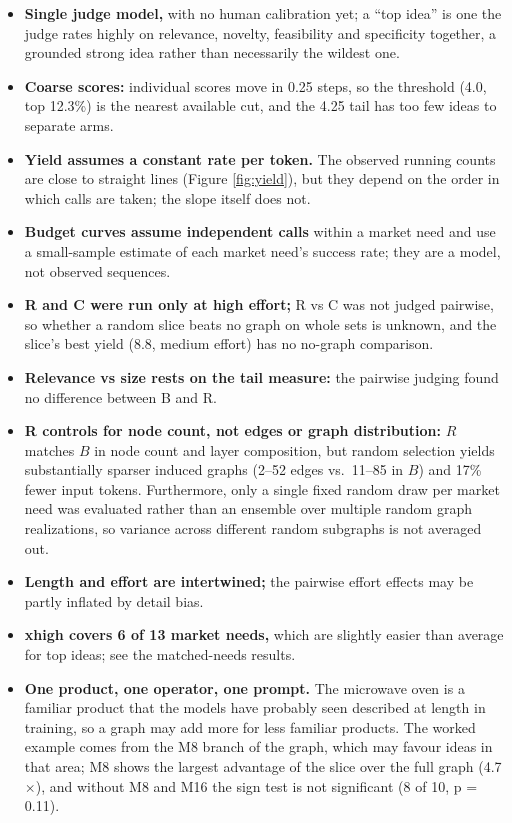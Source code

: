 \begin{itemize}
\tightlist
\item
  \textbf{Single judge model,} with no human calibration yet; a ``top idea'' is one the judge rates highly on relevance, novelty, feasibility and specificity together, a grounded strong idea rather than necessarily the wildest one.
\item
  \textbf{Coarse scores:} individual scores move in 0.25 steps, so the threshold (4.0, top 12.3\%) is the nearest available cut, and the 4.25 tail has too few ideas to separate arms.
\item
  \textbf{Yield assumes a constant rate per token.} The observed running counts are close to straight lines (Figure \ref{fig:yield}), but they depend on the order in which calls are taken; the slope itself does not.
\item
  \textbf{Budget curves assume independent calls} within a market need and use a small-sample estimate of each market need's success rate; they are a model, not observed sequences.
\item
  \textbf{R and C were run only at high effort;} R vs C was not judged pairwise, so whether a random slice beats no graph on whole sets is unknown, and the slice's best yield (8.8, medium effort) has no no-graph comparison.
\item
  \textbf{Relevance vs size rests on the tail measure:} the pairwise judging found no difference between B and R.
\item
  \textbf{R controls for node count, not edges or graph distribution:} $R$ matches $B$ in node count and layer composition, but random selection yields substantially sparser induced graphs (2--52 edges vs.\ 11--85 in $B$) and 17\% fewer input tokens. Furthermore, only a single fixed random draw per market need was evaluated rather than an ensemble over multiple random graph realizations, so variance across different random subgraphs is not averaged out.
\item
  \textbf{Length and effort are intertwined;} the pairwise effort effects may be partly inflated by detail bias.
\item
  \textbf{xhigh covers 6 of 13 market needs,} which are slightly easier than average for top ideas; see the matched-needs results.
\item
  \textbf{One product, one operator, one prompt.} The microwave oven is a familiar product that the models have probably seen described at length in training, so a graph may add more for less familiar products. The worked example comes from the M8 branch of the graph, which may favour ideas in that area; M8 shows the largest advantage of the slice over the full graph (4.7$\times$), and without M8 and M16 the sign test is not significant (8 of 10, p = 0.11).

\end{itemize}
